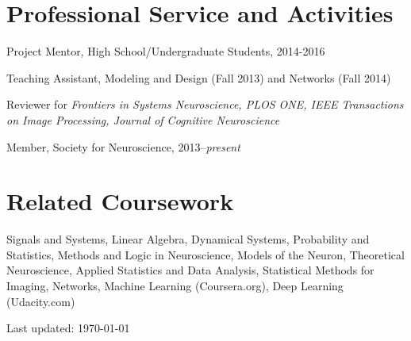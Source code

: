 \documentclass[10pt,letterpaper]{article}
\def\footerlink{} %
\renewenvironment{itemize}{
  \begin{list}{}{
    \setlength{\leftmargin}{1.5em}
    \setlength{\itemsep}{0.25em}
    \setlength{\parskip}{0pt}
    \setlength{\parsep}{0.25em}
  }
}{
  \end{list}
}
\begin{document}
\vspace{-0.1in}

\section*{Professional Service and Activities}
\vspace{-0.05in}
\begin{itemize}
\setlength\itemsep{1pt}
\item Project Mentor, High School/Undergraduate Students, 2014-2016
\item Teaching Assistant, Modeling and Design (Fall 2013) and Networks (Fall 2014)
\item Reviewer for \textit{Frontiers in Systems Neuroscience, PLOS ONE, IEEE Transactions on Image Processing, Journal of Cognitive Neuroscience}

\item Member, Society for Neuroscience, 2013--\textit{present}
\end{itemize}

\vspace{-0.25in}

\section*{Related Coursework}
\vspace{-0.05in}
\begin{itemize}
\item Signals and Systems,
Linear Algebra,
Dynamical Systems,
Probability and Statistics,
Methods and Logic in Neuroscience,
Models of the Neuron,
Theoretical Neuroscience,
Applied Statistics and Data Analysis,
Statistical Methods for Imaging,
Networks, Machine Learning (Coursera.org), Deep Learning (Udacity.com)
\end{itemize}

\bigskip

\begin{center}
  \begin{footnotesize}
    Last updated: \today \\
    \href{\footerlink}{\texttt{\footerlink}}
  \end{footnotesize}
\end{center}

%
\end{document}
